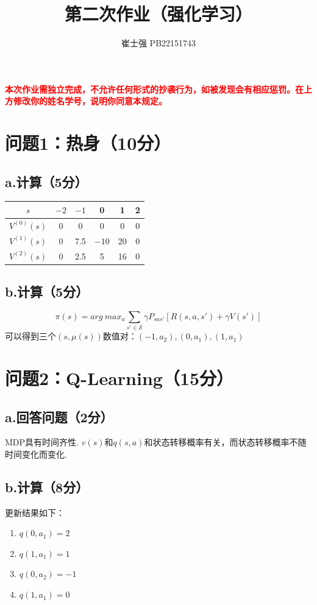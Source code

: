 \documentclass{article}
\title{\bfseries 第二次作业（强化学习）}
\author{崔士强  \quad  PB22151743}
\begin{document}
\maketitle
\textcolor{red}{\textbf{本次作业需独立完成，不允许任何形式的抄袭行为，如被发现会有相应惩罚。在上方修改你的姓名学号，说明你同意本规定。}}

\section*{问题1：热身（10分）}
\subsection*{a.计算（5分）}
\begin{table}[H]
    \centering
    \begin{tabular}{cccccc}
        \hline\hline
        $s$ & $-2$ & $-1$ & 0 & 1 & 2 \\
        \hline
        $V^{(0)}(s)$ & 0 & 0 & 0 & 0 & 0 \\
        $V^{(1)}(s)$ & 0 & 7.5 & $-10$ & 20 & 0 \\
        $V^{(2)}(s)$ & 0 & 2.5 & 5 & 16 & 0 \\
        \hline\hline
    \end{tabular}
\end{table}

\subsection*{b.计算（5分）}
\[\pi(s)=arg\ max_a\sum_{s' \in \mathcal{S}} \gamma P_{sas'} [R(s, a, s')+\gamma V(s')]\]
可以得到三个$(s, \mu(s))$数值对：$(-1, a_2), (0, a_1), (1, a_1)$


\section*{问题2：Q-Learning（15分）}
\subsection*{a.回答问题（2分）}
MDP具有时间齐性. $v(s)$和$q(s, a)$和状态转移概率有关，而状态转移概率不随时间变化而变化.

\subsection*{b.计算（8分）}
更新结果如下：
\begin{enumerate}
    \item $q(0, a_1)=2$
    \item $q(1, a_1)=1$
    \item $q(0, a_2)=-1$
    \item $q(1, a_1)=0$
\end{enumerate}
\end{document}
